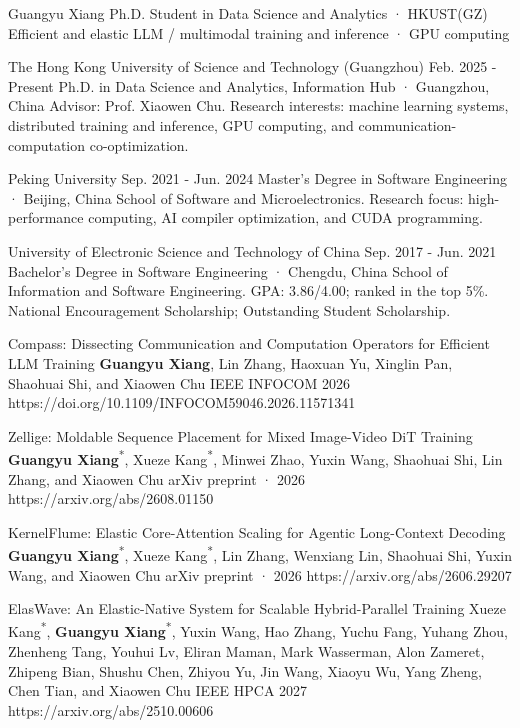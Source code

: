 \documentclass[10pt,a4paper]{article}
\begin{document}
\cvheader
  {Guangyu Xiang}
  {Ph.D. Student in Data Science and Analytics · HKUST(GZ)}
  {Efficient and elastic LLM / multimodal training and inference · GPU computing}


\cventry
  {The Hong Kong University of Science and Technology (Guangzhou)}
  {Feb. 2025 - Present}
  {Ph.D. in Data Science and Analytics, Information Hub · Guangzhou, China}
  {Advisor: Prof. Xiaowen Chu. Research interests: machine learning systems, distributed training and inference, GPU computing, and communication-computation co-optimization.}

\cventry
  {Peking University}
  {Sep. 2021 - Jun. 2024}
  {Master's Degree in Software Engineering · Beijing, China}
  {School of Software and Microelectronics. Research focus: high-performance computing, AI compiler optimization, and CUDA programming.}

\cventry
  {University of Electronic Science and Technology of China}
  {Sep. 2017 - Jun. 2021}
  {Bachelor's Degree in Software Engineering · Chengdu, China}
  {School of Information and Software Engineering. GPA: 3.86/4.00; ranked in the top 5\%. National Encouragement Scholarship; Outstanding Student Scholarship.}


\cvpublication
  {Compass: Dissecting Communication and Computation Operators for Efficient LLM Training}
  {\textbf{Guangyu Xiang}, Lin Zhang, Haoxuan Yu, Xinglin Pan, Shaohuai Shi, and Xiaowen Chu}
  {IEEE INFOCOM 2026}
  {https://doi.org/10.1109/INFOCOM59046.2026.11571341}

\cvpublication
  {Zellige: Moldable Sequence Placement for Mixed Image-Video DiT Training}
  {\textbf{Guangyu Xiang}\textsuperscript{*}, Xueze Kang\textsuperscript{*}, Minwei Zhao, Yuxin Wang, Shaohuai Shi, Lin Zhang, and Xiaowen Chu}
  {arXiv preprint · 2026}
  {https://arxiv.org/abs/2608.01150}

\cvpublication
  {KernelFlume: Elastic Core-Attention Scaling for Agentic Long-Context Decoding}
  {\textbf{Guangyu Xiang}\textsuperscript{*}, Xueze Kang\textsuperscript{*}, Lin Zhang, Wenxiang Lin, Shaohuai Shi, Yuxin Wang, and Xiaowen Chu}
  {arXiv preprint · 2026}
  {https://arxiv.org/abs/2606.29207}

\cvpublication
  {ElasWave: An Elastic-Native System for Scalable Hybrid-Parallel Training}
  {Xueze Kang\textsuperscript{*}, \textbf{Guangyu Xiang}\textsuperscript{*}, Yuxin Wang, Hao Zhang, Yuchu Fang, Yuhang Zhou, Zhenheng Tang, Youhui Lv, Eliran Maman, Mark Wasserman, Alon Zameret, Zhipeng Bian, Shushu Chen, Zhiyou Yu, Jin Wang, Xiaoyu Wu, Yang Zheng, Chen Tian, and Xiaowen Chu}
  {IEEE HPCA 2027}
  {https://arxiv.org/abs/2510.00606}
\end{document}
